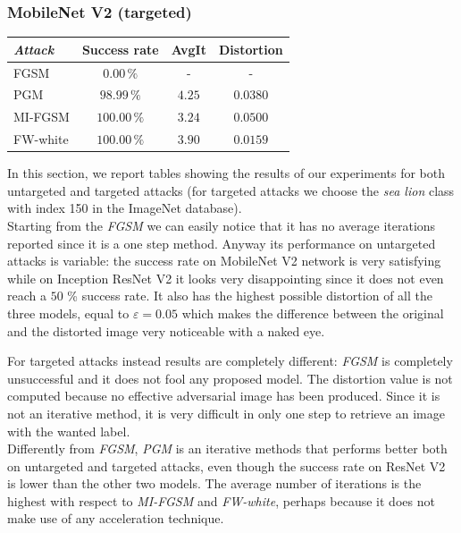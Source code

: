\documentclass[10pt,twocolumn,letterpaper, english]{article}
\theoremstyle{definition}
\theoremstyle{plain}
\theoremstyle{plain}
\theoremstyle{plain}
\theoremstyle{plain}
\theoremstyle{remark}
\theoremstyle{remark}
\theoremstyle{definition}
\theoremstyle{definition}
\theoremstyle{definition}
\theoremstyle{definition}
\renewcommand{\epsilon}{\varepsilon}
\begin{document}
\subsubsection{MobileNet V2 (targeted)}

\begin{center}
    

\begin{tabular}{ |l|c|c|c| }
 \hline
  \textit{Attack} & Success rate & AvgIt & Distortion \\
 \hline
 
 FGSM   & $0.00\,\%$   &  - & -\\
 PGM&   $98.99\,\%$  & $4.25$  & $0.0380$ \\
 MI-FGSM & $100.00\,\%$ & $3.24$ & $0.0500$\\
 FW-white & $100.00\,\%$ & $3.90$ & $0.0159$\\
\hline
\end{tabular}
\end{center}

In this section, we report tables showing the results of our experiments for both untargeted and targeted attacks (for targeted attacks we choose the \textit{sea lion} class with index 150 in the ImageNet database).\\

Starting from the \textit{FGSM} we can easily notice that it has no average iterations reported since it is a one step method. Anyway its performance on untargeted attacks is variable: the success rate on MobileNet V2 network is very satisfying while on Inception ResNet V2 it looks very disappointing since it does not even reach a $50$ \% success rate.
It also has the highest possible distortion of all the three models, equal to $\epsilon = 0.05$ which makes the difference between the original and the distorted image very noticeable with a naked eye.

For targeted attacks instead results are completely different: \textit{FGSM} is completely unsuccessful and it does not fool any proposed model. The distortion value is not computed because no effective adversarial image has been produced. Since it is not an iterative method, it is very difficult in only one step to retrieve an image with the wanted label. \\

Differently from \textit{FGSM}, \textit{PGM} is an iterative methods that performs better both on untargeted and targeted attacks, even though the success rate on ResNet V2 is lower than the other two models. The average number of iterations is the highest with respect to \textit{MI-FGSM} and \textit{FW-white}, perhaps because it does not make use of any acceleration technique. 
\end{document}
